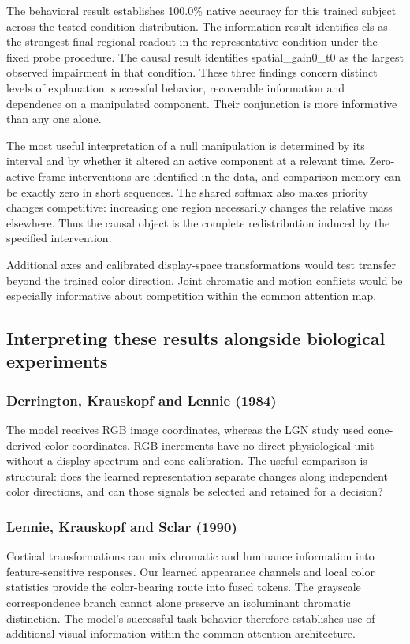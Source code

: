 \documentclass[11pt]{article}
\begin{document}
The behavioral result establishes 100.0\% native accuracy for this trained subject across the tested condition distribution. The information result identifies cls as the strongest final regional readout in the representative condition under the fixed probe procedure. The causal result identifies spatial\_\allowbreak{}gain0\_\allowbreak{}t0 as the largest observed impairment in that condition. These three findings concern distinct levels of explanation: successful behavior, recoverable information and dependence on a manipulated component. Their conjunction is more informative than any one alone.

The most useful interpretation of a null manipulation is determined by its interval and by whether it altered an active component at a relevant time. Zero-active-frame interventions are identified in the data, and comparison memory can be exactly zero in short sequences. The shared softmax also makes priority changes competitive: increasing one region necessarily changes the relative mass elsewhere. Thus the causal object is the complete redistribution induced by the specified intervention.

Additional axes and calibrated display-space transformations would test transfer beyond the trained color direction. Joint chromatic and motion conflicts would be especially informative about competition within the common attention map.

\subsection{Interpreting these results alongside biological experiments}
\subsubsection{Derrington, Krauskopf and Lennie (1984)}
The model receives RGB image coordinates, whereas the LGN study used cone-derived color coordinates. RGB increments have no direct physiological unit without a display spectrum and cone calibration. The useful comparison is structural: does the learned representation separate changes along independent color directions, and can those signals be selected and retained for a decision? \cite{bio_derrington}

\subsubsection{Lennie, Krauskopf and Sclar (1990)}
Cortical transformations can mix chromatic and luminance information into feature-sensitive responses. Our learned appearance channels and local color statistics provide the color-bearing route into fused tokens. The grayscale correspondence branch cannot alone preserve an isoluminant chromatic distinction. The model’s successful task behavior therefore establishes use of additional visual information within the common attention architecture. \cite{bio_lennie}
\end{document}
